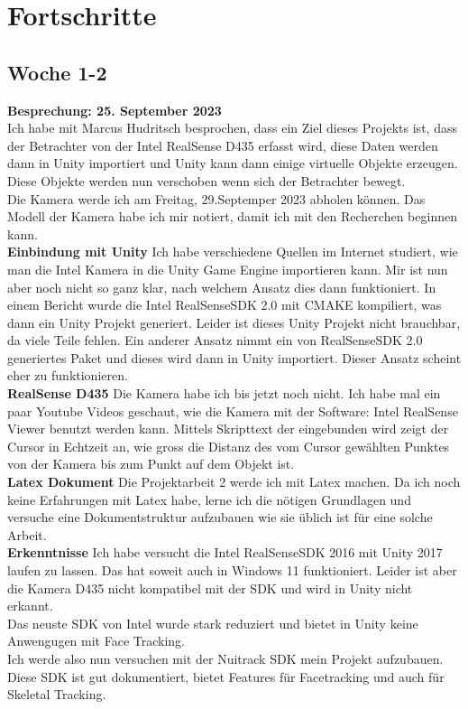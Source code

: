 \section{Fortschritte}
\subsection{Woche 1-2}
\textbf{Besprechung: 25. September 2023} \\
Ich habe mit Marcus Hudritsch besprochen, dass ein Ziel dieses Projekts ist, dass der Betrachter von der Intel RealSense D435 erfasst wird, diese Daten werden dann in Unity importiert und Unity kann dann einige virtuelle Objekte erzeugen. Diese Objekte werden nun verschoben wenn sich der Betrachter bewegt.\\
Die Kamera werde ich am Freitag, 29.Septemper 2023 abholen k\"onnen. Das Modell der Kamera habe ich mir notiert, damit ich mit den Recherchen beginnen kann.\\
\textbf{Einbindung mit Unity}
Ich habe verschiedene Quellen im Internet studiert, wie man die Intel Kamera in die Unity Game Engine importieren kann. Mir ist nun aber noch nicht so ganz klar, nach welchem Ansatz dies dann funktioniert. In einem Bericht wurde die Intel RealSenseSDK 2.0 mit CMAKE kompiliert, was dann ein Unity Projekt generiert. Leider ist dieses Unity Projekt nicht brauchbar, da viele Teile fehlen. Ein anderer Ansatz nimmt ein von RealSenseSDK 2.0 generiertes Paket und dieses wird dann in Unity importiert. Dieser Ansatz scheint eher zu funktionieren.\\
\textbf{RealSense D435} 
Die Kamera habe ich bis jetzt noch nicht. Ich habe mal ein paar Youtube Videos geschaut, wie die Kamera mit der Software: Intel RealSense Viewer benutzt werden kann. Mittels Skripttext der eingebunden wird zeigt der Cursor in Echtzeit an, wie gross die Distanz des vom Cursor gew\"ahlten Punktes von der Kamera bis zum Punkt auf dem Objekt ist. \\
\textbf{Latex Dokument}
Die Projektarbeit 2 werde ich mit Latex machen. Da ich noch keine Erfahrungen mit Latex habe, lerne ich die n\"otigen Grundlagen und versuche eine Dokumentstruktur aufzubauen wie sie \"ublich ist f\"ur eine solche Arbeit.\\ \textbf{Erkenntnisse}
Ich habe versucht die Intel RealSenseSDK 2016 mit Unity 2017 laufen zu lassen. Das hat soweit auch in Windows 11 funktioniert. Leider ist aber die Kamera D435 nicht kompatibel mit der SDK und wird in Unity nicht erkannt. \\ Das neuste SDK von Intel wurde stark reduziert und bietet in Unity keine Anwengugen mit Face Tracking. \\ Ich werde also nun versuchen mit der Nuitrack SDK mein Projekt aufzubauen. Diese SDK ist gut dokumentiert, bietet Features für Facetracking und auch für Skeletal Tracking.

